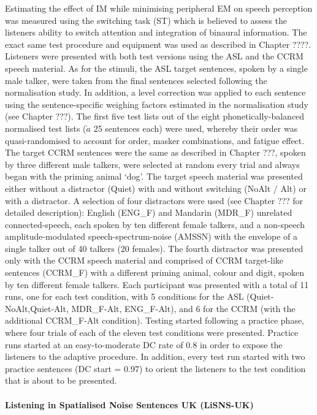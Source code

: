 \documentclass[a4paper, twoside]{templates/ociamthesis}
\begin{document}
\hfill\break
Estimating the effect of IM while minimising peripheral EM on speech perception was measured using the switching task (ST) which is believed to assess the listeners ability to switch attention and integration of binaural information. The exact same test procedure and equipment was used as described in Chapter ????. Listeners were presented with both test versions using the ASL and the CCRM speech material. As for the stimuli, the ASL target sentences, spoken by a single male talker, were taken from the final sentences selected following the normalisation study. In addition, a level correction was applied to each sentence using the sentence-specific weighing factors estimated in the normalisation study (see Chapter ???). The first five test lists out of the eight phonetically-balanced normalised test lists (\(\grave{a}\) 25 sentences each) were used, whereby their order was quasi-randomised to account for order, masker combinations, and fatigue effect. The target CCRM sentences were the same as described in Chapter ???, spoken by three different male talkers, were selected at random every trial and always began with the priming animal `dog'. The target speech material was presented either without a distractor (Quiet) with and without switching (NoAlt / Alt) or with a distractor. A selection of four distractors were used (see Chapter ??? for detailed description): English (ENG\_F) and Mandarin (MDR\_F) unrelated connected-speech, each spoken by ten different female talkers, and a non-speech amplitude-modulated speech-spectrum-noise (AMSSN) with the envelope of a single talker out of 40 talkers (20 females). The fourth distractor was presented only with the CCRM speech material and comprised of CCRM target-like sentences (CCRM\_F) with a different priming animal, colour and digit, spoken by ten different female talkers. Each participant was presented with a total of 11 runs, one for each test condition, with 5 conditions for the ASL (Quiet-NoAlt,Quiet-Alt, MDR\_F-Alt, ENG\_F-Alt), and 6 for the CCRM (with the additional CCRM\_F-Alt condition). Testing started following a practice phase, where four trials of each of the eleven test conditions were presented. Practice runs started at an easy-to-moderate DC rate of 0.8 in order to expose the listeners to the adaptive procedure. In addition, every test run started with two practice sentences (DC start = 0.97) to orient the listeners to the test condition that is about to be presented.\\

\hypertarget{listening-in-spatialised-noise-sentences-uk-lisns-uk}{%
\paragraph{Listening in Spatialised Noise Sentences UK (LiSNS-UK)}\label{listening-in-spatialised-noise-sentences-uk-lisns-uk}}
\end{document}
